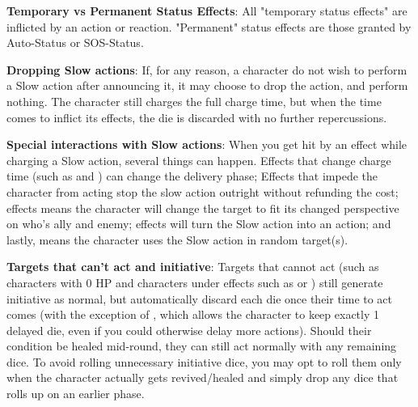 \begin{multicols}{2}
\textbf{Temporary vs Permanent Status Effects}: All "temporary status effects" are inflicted by an action or reaction. "Permanent" status effects are those granted by Auto-Status or SOS-Status.

\textbf{Dropping Slow actions}: If, for any reason, a character do not wish to perform a Slow action after announcing it, it may choose to drop the action, and perform nothing. The character still charges the full charge time, but when the time comes to inflict its effects, the die is discarded with no further repercussions.

\textbf{Special interactions with Slow actions}: When you get hit by an effect while charging a Slow action, several things can happen. Effects that change charge time (such as  and ) can change the delivery phase; Effects that impede the character from acting stop the slow action outright without refunding the cost;  effects means the character will change the target to fit its changed perspective on who's ally and enemy;  effects will turn the Slow action into an  action; and lastly,  means the character uses the Slow action in random target(s).

\textbf{Targets that can't act and initiative}: Targets that cannot act (such as characters with 0 HP and characters under effects such as  or ) still generate initiative as normal, but automatically discard each die once their time to act comes (with the exception of , which allows the character to keep exactly 1 delayed die, even if you could otherwise delay more actions). Should their condition be healed mid-round, they can still act normally with any remaining dice. To avoid rolling unnecessary initiative dice, you may opt to roll them only when the character actually gets revived/healed and simply drop any dice that rolls up on an earlier phase.

\end{multicols}